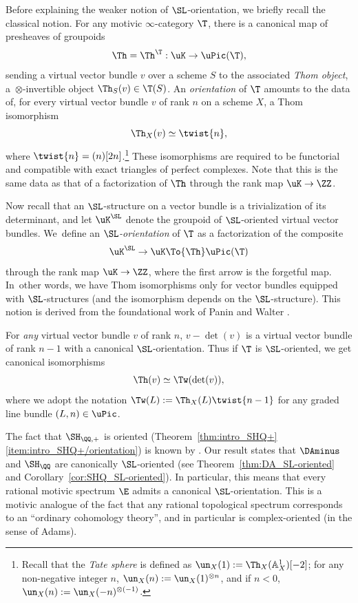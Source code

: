 Before explaining the weaker notion of $\SL$-orientation, we briefly recall the classical notion.
For any motivic $\infty$-category $\T$, there is a canonical map of presheaves of groupoids
\[
\Th = \Th^\T : \uK \to \uPic(\T),
\]
sending a virtual vector bundle $v$ over a scheme $S$ to the associated \emph{Thom object}, a~$\otimes$-invertible object $\Th_S(v) \in \T(S)$.
An \emph{orientation} of $\T$ amounts to the data of, for every virtual vector bundle $v$ of rank $n$ on a scheme $X$, a Thom isomorphism
\[
\Th_X(v) \simeq \twist{n},
\]
where $\twist{n} = (n)[2n]$.\footnote{Recall that the \emph{Tate sphere} is defined as $\un_X(1):=\Th_X(\mathbb{A}^1_X)[-2]$; for any non-negative integer $n$, $\un_X(n):=\un_X(1)^{\otimes n}$, and if $n<0$, $\un_X(n):=\un_X(-n)^{\otimes (-1)}$.}
These isomorphisms are required to be functorial and compatible with exact triangles of perfect complexes.
Note that this is the same data as that of a factorization of $\Th$ through the rank map $\uK \to \ZZ$.

Now recall that an $\SL$-structure on a vector bundle is a trivialization of its deter\-mi\-nant, and let $\uK^\SL$ denote the groupoid of $\SL$-oriented virtual vector bundles.
We~define an \emph{$\SL$-orientation} of $\T$ as a factorization of the composite
\[
\uK^\SL \to \uK \To{\Th} \uPic(\T)
\]
through the rank map $\uK \to \ZZ$, where the first arrow is the forgetful map.
In~other words, we have Thom isomorphisms only for vector bundles equipped with $\SL$\nobreakdash-structures (and the isomorphism depends on the $\SL$-structure).
This notion is derived from the foundational work of Panin and Walter \cite{PaninWalter1}.

For \emph{any} virtual vector bundle $v$ of rank $n$, $v - \det(v)$ is a virtual vector bundle of rank $n-1$ with a canonical $\SL$-orientation.
Thus if $\T$ is $\SL$-oriented, we get canonical isomorphisms
\[
\Th(v) \simeq \Tw(\det(v)),
\]
where we adopt the notation $\Tw(L) := \Th_X(L)\twist{n-1}$ for any graded line bundle $(L, n) \in \uPic$.

The fact that $\SH_{\QQ,+}$ is oriented (Theorem~\ref{thm:intro_SHQ+}\eqref{item:intro_SHQ+/orientation}) is known by \cite[14.2.5 \& Th.\,16.2.13]{CD3}.
Our result states that $\DAminus$ and $\SH_\QQ$ are canonically $\SL$-oriented (see Theorem~\ref{thm:DA_SL-oriented} and Corollary~\ref{cor:SHQ_SL-oriented}).
In particular, this means that every rational motivic spectrum $\E$ admits a canonical $\SL$-orientation.
This is a motivic analogue of the fact that any rational topological spectrum corresponds to an ``ordinary cohomology theory'', and in particular is complex-oriented (in the sense of Adams).

